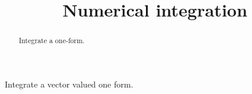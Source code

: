 \documentclass{ximera}
\title{Numerical integration}
\begin{document}
\begin{abstract}
  Integrate a one-form.
\end{abstract}

\begin{exercise}
	Integrate a vector valued one form.
\end{exercise}
\end{document}
